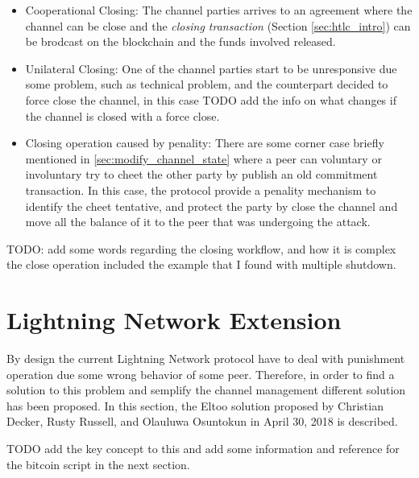 \begin{itemize}
  \item Cooperational Closing: The channel parties arrives to an agreement where the channel can be close and the
        \emph{closing transaction} (Section \ref{sec:htlc_intro}) can be brodcast on the blockchain and the funds involved released.
  \item Unilateral Closing: One of the channel parties start to be unresponsive due some problem, such as technical problem, and the counterpart
        decided to force close the channel, in this case TODO add the info on what changes if the channel is closed with a force close.
  \item Closing operation caused by penality: There are some corner case briefly mentioned in \ref{sec:modify_channel_state} where a peer can voluntary or involuntary try
        to cheet the other party by publish an old commitment transaction. In this case, the protocol provide a penality mechanism to identify
        the cheet tentative, and protect the party by close the channel and move all the balance of it to the peer that was undergoing the attack.
\end{itemize}

TODO: add some words regarding the closing workflow, and how it is complex the close operation included the example that I found with multiple shutdown.

\section{Lightning Network Extension}
\label{sec:eltoo}

By design the current Lightning Network protocol have to deal with punishment operation due some wrong behavior of some peer. Therefore, in order
to find a solution to this problem and semplify the channel management different solution has been proposed.
In this section, the Eltoo \cite{eltoo} solution proposed by Christian Decker, Rusty Russell, and Olauluwa Osuntokun in April 30, 2018 is described.

TODO add the key concept to this and add some information and reference for the bitcoin script in the next section.
